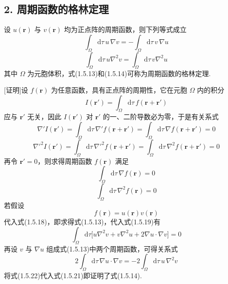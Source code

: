 \subsection*{2. 周期函数的格林定理}

设 $u(\boldsymbol{r})$ 与 $v(\boldsymbol{r})$ 均为正点阵的周期函数，则下列等式成立
\begin{equation}
  \int_{\Omega}\mathrm{d}\tau\,u\,\nabla v
  =-\int_{\Omega}\mathrm{d}\tau\,v\,\nabla u
\end{equation}
\begin{equation}
  \int_{\Omega}\mathrm{d}\tau\,u\nabla^2v
  =\int_{\Omega}\mathrm{d}\tau\,v\nabla^2u
\end{equation}
其中 $\Omega$ 为元胞体积，式(1.5.13)和(1.5.14)可称为周期函数的格林定理.

[证明]设 $f(\boldsymbol{r})$ 为任意函数，具有正点阵的周期性，它在元胞 $\Omega$ 内的积分
\begin{equation}
  I(\boldsymbol{r}')=\int_{\Omega}\mathrm{d}\tau\,f(\boldsymbol{r}+\boldsymbol{r}')
\end{equation}
应与 $\boldsymbol{r}'$ 无关，因此 $I(\boldsymbol{r}')$ 对 $\boldsymbol{r}'$ 的一、二阶导数必为零，于是有关系式
\begin{equation}
  \nabla'I(\boldsymbol{r}')
  =\int_{\Omega}\mathrm{d}\tau\,\nabla'f(\boldsymbol{r}+\boldsymbol{r}')
  =\int_{\Omega}\mathrm{d}\tau\,\nabla f(\boldsymbol{r}+\boldsymbol{r}')=0
\end{equation}
\begin{equation}
  \nabla'^2I(\boldsymbol{r}')
  =\int_{\Omega}\mathrm{d}\tau\,\nabla'^2f(\boldsymbol{r}+\boldsymbol{r}')
  =\int_{\Omega}\mathrm{d}\tau\,\nabla^2 f(\boldsymbol{r}+\boldsymbol{r}')=0
\end{equation}
再令 $\boldsymbol{r}'=0$，则求得周期函数 $f(\boldsymbol{r})$ 满足
\begin{equation}
  \int_{\Omega}\mathrm{d}\tau\,\nabla f(\boldsymbol{r})=0
\end{equation}
\begin{equation}
  \int_{\Omega}\mathrm{d}\tau\,\nabla^2 f(\boldsymbol{r})=0
\end{equation}
若假设
\begin{equation}
  f(\boldsymbol{r})=u(\boldsymbol{r})v(\boldsymbol{r})
\end{equation}
代入式(1.5.18)，即求得式(1.5.13)，代入式(1.5.19)有
\begin{equation}
  \int_{\Omega}\mathrm{d}\tau\bigl[u\nabla^2v+v\nabla^2u
  +2\nabla u\cdot\nabla v\bigr]=0
\end{equation}
再设 $v$ 与 $\nabla u$ 组成式(1.5.13)中两个周期函数，可得关系式
\begin{equation}
  2\int_{\Omega}\mathrm{d}\tau\,\nabla u\cdot\nabla v
  =-2\int_{\Omega}\mathrm{d}\tau\,u\,\nabla^2v
\end{equation}
将式(1.5.22)代入式(1.5.21)即证明了式(1.5.14).

